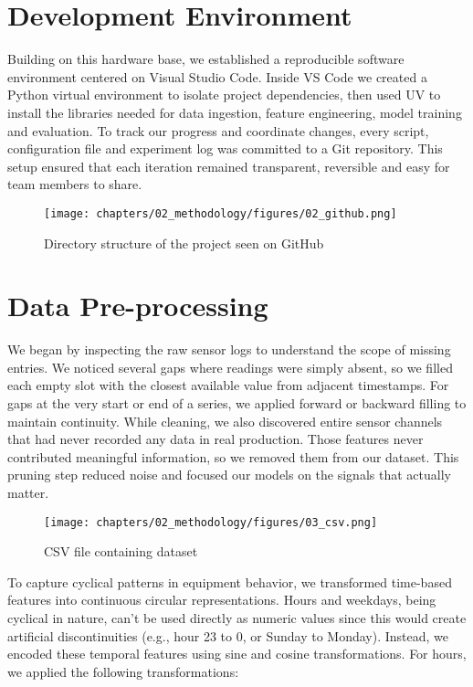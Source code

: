 \section{Development Environment}

Building on this hardware base, we established a reproducible software environment centered on Visual Studio Code. Inside VS Code we created a Python virtual environment to isolate project dependencies, then used UV to install the libraries needed for data ingestion, feature engineering, model training and evaluation. To track our progress and coordinate changes, every script, configuration file and experiment log was committed to a Git repository. This setup ensured that each iteration remained transparent, reversible and easy for team members to share.

\begin{figure}[H]
    \centering
    \texttt{[image: chapters/02\_methodology/figures/02\_github.png]}
    \caption{Directory structure of the project seen on GitHub}
\end{figure}

\section{Data Pre-processing}
We began by inspecting the raw sensor logs to understand the scope of missing entries. We noticed several gaps where readings were simply absent, so we filled each empty slot with the closest available value from adjacent timestamps. For gaps at the very start or end of a series, we applied forward or backward filling to maintain continuity. While cleaning, we also discovered entire sensor channels that had never recorded any data in real production. Those features never contributed meaningful information, so we removed them from our dataset. This pruning step reduced noise and focused our models on the signals that actually matter.

\begin{figure}[H]
    \centering
    \texttt{[image: chapters/02\_methodology/figures/03\_csv.png]}
    \caption{CSV file containing dataset}
\end{figure}

To capture cyclical patterns in equipment behavior, we transformed time-based features into continuous circular representations. Hours and weekdays, being cyclical in nature, can't be used directly as numeric values since this would create artificial discontinuities (e.g., hour 23 to 0, or Sunday to Monday). Instead, we encoded these temporal features using sine and cosine transformations.
For hours, we applied the following transformations:


